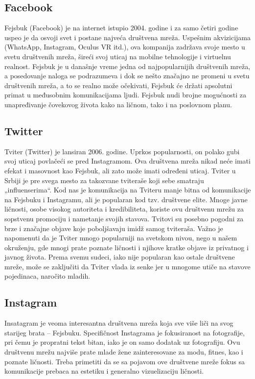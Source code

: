 \documentclass[a4paper]{article}
\begin{document}
{		\subsection{Facebook}
		\label{subsec:podnaslov1}
		Fejsbuk (Facebook) je na internet istupio 2004. godine i za samo četiri godine uspeo je da osvoji svet i postane najveća društvena mreža. Uspešnim akvizicijama (WhatsApp, Instagram, Oculus VR itd.), ova kompanija zadržava svoje mesto u svetu društvenih mreža, šireći svoj uticaj na mobilne tehnologije i virtuelnu realnost. Fejsbuk je u današnje vreme jedna od najpopularnijih društvenih mreža, a posedovanje naloga se podrazumeva i dok se nešto značajno ne promeni u svetu društvenih mreža, a to se realno može očekivati, Fejsbuk će držati apsolutni primat u međusobnim komunikacijama ljudi. Fejsbuk nudi brojne mogućnosti za unapređivanje čovekovog života kako na ličnom, tako i na poslovnom planu.
		\subsection{Twitter}
		\label{subsec:podnaslov2}
		Tviter (Twitter) je lansiran 2006. godine. Uprkos popularnosti, on polako gubi svoj uticaj povlačeći se pred Instagramom. Ova društvena mreža nikad neće imati efekat i masovnost kao Fejsbuk, ali zato može imati određeni uticaj. Tviter u Srbiji je pre svega mesto za takozvane tviteraše koji sebe smatraju „influenserima“. Kod nas je komunikacija na Tviteru manje bitna od komunikacije na Fejsbuku i Instagramu, ali je popularan kod tzv. društvene elite. Mnoge javne ličnosti, osobe visokog autoriteta i kredibiliteta, koriste ovu društvenu mrežu za sopstvenu promociju i nametanje svojih stavova. Tvitovi su posebno pogodni za brze i značajne objave koje poboljšavaju imidž samog tviteraša. Važno je napomenuti da je Tviter mnogo popularniji na svetskom nivou, nego u našem okruženju, gde mnogi prate poznate ličnosti i njihove kratke objave iz privatnog i javnog života. Prema svemu sudeci, iako nije popularan kao ostale društvene mreže, može se zaključiti da Tviter vlada iz senke jer u mnogome utiče na stavove pojedinaca, naročito mladih.
		\subsection{Instagram}
		\label{subsec:podnaslov3}
		Insatagram je veoma interesantna društvena mreža koja sve više liči na svog starijeg brata – Fejsbuku. Specifičnost Instagrama je fokusiranost na fotografije, pri čemu je propratni tekst bitan, iako je on samo dodatak uz fotografiju. Ovu društvenu mrežu najviše prate mlade žene zainteresovane za modu, fitnes, kao i poznate ličnosti. Treba primetiti da se sa pojavom ove društvene mreže fokus sa komunikacije prebaca na estetiku i generalno vizuelizaciju ličnosti.
}
\end{document}
